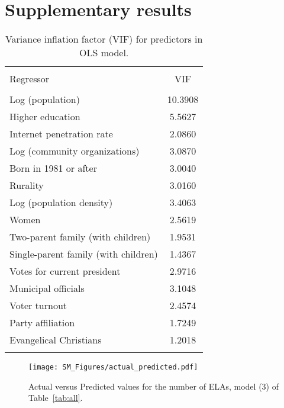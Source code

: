 \documentclass[onecolumn]{article}
\begin{document}
\clearpage
\newpage

\section{Supplementary results}
\label{sec:SMresults}



\begin{table}[!htbp] 
\centering 
  \caption{Variance inflation factor (VIF) for predictors in OLS model.} 
  \label{tab:SM_VIF} 
\begin{tabular}{@{\extracolsep{5pt}}lc } 
\\[-1.8ex]\hline 
\hline \\[-1.8ex] 
Regressor &          VIF  \\
                     \hline \\[-1.8ex] 
Log (population)    & 10.3908 \\         
Higher education      &     5.5627         \\
Internet penetration rate  &              2.0860    \\     
Log (community organizations) &           3.0870   \\
Born in 1981 or after          &     3.0040\\
Rurality    &     3.0160         \\
Log (population density) &      3.4063\\         
Women   &        2.5619         \\
Two-parent family (with children) &  1.9531         \\
Single-parent family (with children) &        1.4367  \\       
Votes for current president   & 2.9716         \\
Municipal officials      & 3.1048         \\
Voter turnout        & 2.4574         \\
Party affiliation  & 1.7249         \\
Evangelical Christians &             1.2018\\         
\hline 
\hline \\[-1.8ex] 
\end{tabular} 
\end{table}  



\begin{figure}[h!]
\centering
\texttt{[image: SM\_Figures/actual\_predicted.pdf]}
\caption{Actual versus Predicted values for the number of ELAs, model (3) of Table~\ref{tab:all}.}
\label{fig_sim}
\end{figure}
\end{document}
